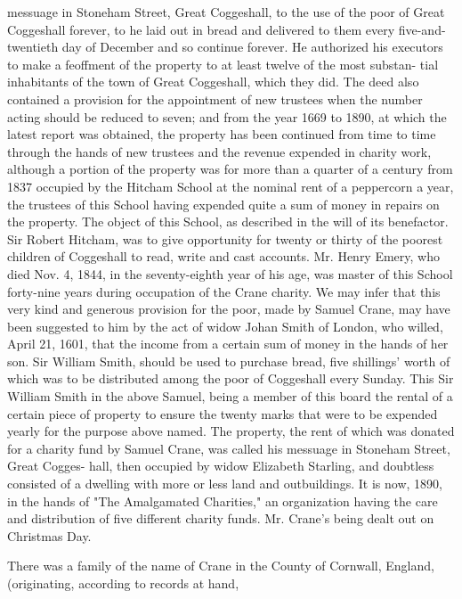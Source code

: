 \documentclass[oneside]{book}
\begin{document}
messuage in Stoneham Street, Great Coggeshall, to the use of the 
poor of Great Coggeshall forever, to he laid out in bread and 
delivered to them every five-and-twentieth day of December and 
so continue forever. He authorized his executors to make a 
feoffment of the property to at least twelve of the most substan- 
tial inhabitants of the town of Great Coggeshall, which they did. 
The deed also contained a provision for the appointment of new 
trustees when the number acting should be reduced to seven; 
and from the year 1669 to 1890, at which the latest report was 
obtained, the property has been continued from time to time 
through the hands of new trustees and the revenue expended in 
charity work, although a portion of the property was for more 
than a quarter of a century from 1837 occupied by the Hitcham 
School at the nominal rent of a peppercorn a year, the trustees of 
this School having expended quite a sum of money in repairs on 
the property. The object of this School, as described in the will 
of its benefactor. Sir Robert Hitcham, was to give opportunity 
for twenty or thirty of the poorest children of Coggeshall to read, 
write and cast accounts. Mr. Henry Emery, who died Nov. 4, 
1844, in the seventy-eighth year of his age, was master of this 
School forty-nine years during occupation of the Crane charity. 
We may infer that this very kind and generous provision for the 
poor, made by Samuel Crane, may have been suggested to him 
by the act of widow Johan Smith of London, who willed, April 
21, 1601, that the income from a certain sum of money in the 
hands of her son. Sir William Smith, should be used to purchase 
bread, five shillings' worth of which was to be distributed among 
the poor of Coggeshall every Sunday. This Sir William Smith in 
the above Samuel, being a member of this board  the rental of a 
certain piece of property to ensure the twenty marks that were to 
be expended yearly for the purpose above named. The property, 
the rent of which was donated for a charity fund by Samuel 
Crane, was called his messuage in Stoneham Street, Great Cogges- 
hall, then occupied by widow Elizabeth Starling, and doubtless 
consisted of a dwelling with more or less land and outbuildings. 
It is now, 1890, in the hands of "The Amalgamated Charities," 
an organization having the care and distribution of five different 
charity funds. Mr. Crane's being dealt out on Christmas Day. 

There was a family of the name of Crane in the County of 
Cornwall, England, (originating, according to records at hand, 
\end{document}
